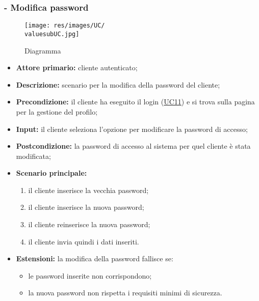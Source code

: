 \subsubsection{ - Modifica password}
\begin{figure}[H]
    \centering
    \texttt{[image: res/images/UC/\\valuesubUC.jpg]}
    \caption{Diagramma }
\end{figure}
\begin{itemize}
    \item \textbf{Attore primario:} cliente autenticato;
    \item \textbf{Descrizione:} scenario per la modifica della password del cliente;
    \item \textbf{Precondizione:} il cliente ha eseguito il login (\hyperref[UC11]{UC11}) e si trova sulla pagina per la gestione del profilo;
    \item \textbf{Input:} il cliente seleziona l'opzione per modificare la password di accesso;
    \item \textbf{Postcondizione:} la password di accesso al sistema per quel cliente è stata modificata;
    \item \textbf{Scenario principale:}
          \begin{enumerate}
              \item il cliente inserisce la vecchia password;
              \item il cliente inserisce la nuova password;
              \item il cliente reinserisce la nuova password;
              \item il cliente invia quindi i dati inseriti.
          \end{enumerate}
    \item \textbf{Estensioni:} la modifica della password fallisce se:
          \begin{itemize}
              \item le password inserite non corrispondono;
              \item la nuova password non rispetta i requisiti minimi di sicurezza.
          \end{itemize}
\end{itemize}

\stepUserCase
